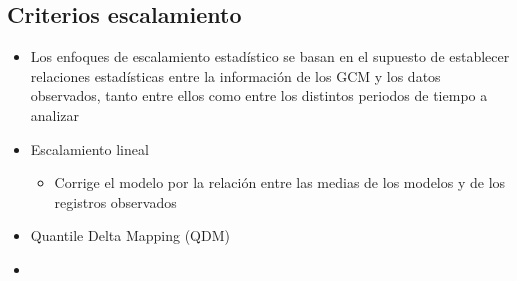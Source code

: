 \subsection{Criterios escalamiento}
\begin{itemize}
    \item Los enfoques de escalamiento estadístico se basan en el supuesto de establecer relaciones estadísticas entre la información de los GCM y los datos observados, tanto entre ellos como entre los distintos periodos de tiempo a analizar
    \item Escalamiento lineal
    \begin{itemize}
        \item Corrige el modelo por la relación entre las medias de los modelos y de los registros observados
    \end{itemize}
    \item Quantile Delta Mapping (QDM)
    \item 
\end{itemize}




